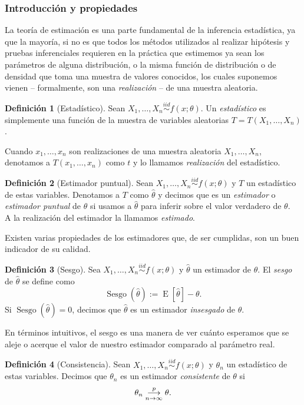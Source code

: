 \documentclass[11pt,letterpaper]{article}
\newcommand{\expected}{\ensuremath{\operatorname{E}}}
\newcommand{\bias}{\ensuremath{\operatorname{Sesgo}}}
\theoremstyle{definition}
\newtheorem{definition}{Definición}[section]
\theoremstyle{theorem}
\theoremstyle{remark}
\begin{document}
	\subsubsection{Introducción y propiedades}
	\noindent\justify La teoría de estimación es una parte fundamental de la inferencia estadística, ya que la mayoría, si no es que todos los métodos utilizados al realizar hipótesis y pruebas inferenciales requieren en la práctica que estimemos ya sean los parámetros de alguna distribución, o la misma función de distribución o de densidad que toma una muestra de valores conocidos, los cuales suponemos vienen -- formalmente, son una \textit{realización} -- de una muestra aleatoria.
	\begin{definition}[Estadístico]
		Sean \(X_1,\dots,X_n\overset{iid}{\sim}f(x;\theta)\). Un \textit{estadístico} es simplemente una función de la muestra de variables aleatorias \(T=T(X_1,\dots,X_n)\).
	\end{definition}
	Cuando \(x_1,\dots,x_n\) son realizaciones de una muestra aleatoria \(X_1,\dots,X_n\), denotamos a \(T(x_1,\dots,x_n)\) como \(t\) y lo llamamos \textit{realización} del estadístico.
	\begin{definition}[Estimador puntual]
		Sean \(X_1,\dots,X_n\overset{iid}{\sim}f(x;\theta)\) y \(T\) un estadístico de estas variables. Denotamos a \(T\) como \(\hat{\theta}\) y decimos que es un \textit{estimador} o \textit{estimador puntual} de \(\theta\) si usamos a \(\hat{\theta}\) para inferir sobre el valor verdadero de \(\theta\). \\
		A la realización del estimador la llamamos \textit{estimado}.
	\end{definition}
	Existen varias propiedades de los estimadores que, de ser cumplidas, son un buen indicador de su calidad.
	\begin{definition}[Sesgo]
		Sea \(X_1,\dots,X_n\overset{iid}{\sim}f(x;\theta)\) y \(\hat{\theta}\) un estimador de \(\theta\). El \textit{sesgo} de \(\hat{\theta}\) se define como \[\bias(\hat{\theta}):=\expected[\hat{\theta}]-\theta.\] Si \(\bias (\hat{\theta})=0\), decimos que \(\hat{\theta}\) es un estimador \textit{insesgado} de \(\theta\).
	\end{definition}
	En términos intuitivos, el sesgo es una manera de ver cuánto esperamos que se aleje o acerque el valor de nuestro estimador comparado al parámetro real.
	\begin{definition}[Consistencia]
		Sean \(X_1,\dots,X_n\overset{iid}{\sim}f(x;\theta)\) y \(\theta_n\) un estadístico de estas variables. Decimos que \(\theta_n\) es un estimador \textit{consistente} de \(\theta\) si
		\[\theta_n\overunderset{p}{n\to\infty}{\longrightarrow}\theta.\]
	\end{definition}
\end{document}
